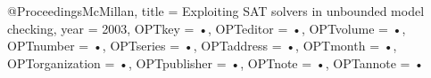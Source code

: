 @Proceedings{McMillan,
title = {Exploiting SAT solvers in unbounded model checking},
year = {2003},
OPTkey = {•},
OPTeditor = {•},
OPTvolume = {•},
OPTnumber = {•},
OPTseries = {•},
OPTaddress = {•},
OPTmonth = {•},
OPTorganization = {•},
OPTpublisher = {•},
OPTnote = {•},
OPTannote = {•}
}
